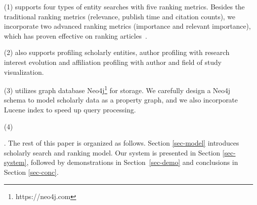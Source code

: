\noindent (1) \oursystem supports four types of entity searches with five ranking metrics. Besides the traditional ranking metrics (relevance, publish time and citation counts), we incorporate two advanced ranking metrics (importance and relevant importance), which has proven effective on ranking articles~\cite{ma2018query}.

\noindent (2) \oursystem also supports profiling scholarly entities, \eg author profiling with research interest evolution and affiliation profiling with author and field of study visualization.

\noindent  (3) \oursystem utilizes graph database Neo4j\footnote{https://neo4j.com} for storage. We carefully design a Neo4j schema to model scholarly data as a property graph, and we also incorporate Lucene index to speed up query processing.


\noindent (4) 





.
The rest of this paper is organized as follows. Section \ref{sec-model} introduces scholarly search and ranking model. Our \oursystem system is presented in Section \ref{sec-system}, followed by demonstrations in Section~\ref{sec-demo} and conclusions in Section \ref{sec-conc}.





